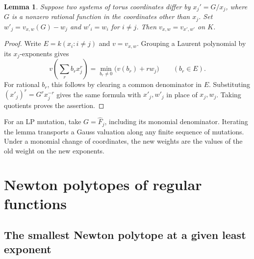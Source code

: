 \documentclass[11pt,reqno]{amsart}
\numberwithin{equation}{section}
\newtheorem{lemma}[theorem]{Lemma}
\theoremstyle{definition}
\theoremstyle{remark}
\begin{document}
\begin{lemma}\label{lem:boundary-gauss-change}
Suppose two systems of torus coordinates differ by
\(x_j'=G/x_j\), where \(G\) is a nonzero rational function in the
coordinates other than \(x_j\). Set \(w'_j=v_{x,w}(G)-w_j\) and
\(w'_i=w_i\) for \(i\ne j\). Then \(v_{x,w}=v_{x',w'}\) on \(K\).
\end{lemma}

\begin{proof}
Write \(E=k(x_i:i\ne j)\) and \(v=v_{x,w}\). Grouping a Laurent
polynomial by its \(x_j\)-exponents gives
\[ v\!\left(\sum_r b_r x_j^r\right) =\min_{b_r\ne0}\bigl(v(b_r)+r w_j\bigr)\qquad (b_r\in E). \]
For rational \(b_r\), this follows by clearing a common denominator in
\(E\). Substituting \((x'_j)^r=G^r x_j^{-r}\) gives the same formula
with \(x'_j,w'_j\) in place of \(x_j,w_j\). Taking quotients proves
the assertion.
\end{proof}

For an LP mutation, take \(G=\widehat F_j\), including its monomial
denominator. Iterating the lemma transports a Gauss valuation along any
finite sequence of mutations. Under a monomial change of coordinates,
the new weights are the values of the old weight on the new exponents.

\section{Newton polytopes of regular functions}\label{sec:source-polytopes}

\subsection{The smallest Newton polytope at a given least exponent}
\label{subsec:smallest-newton-polytope}
\end{document}

